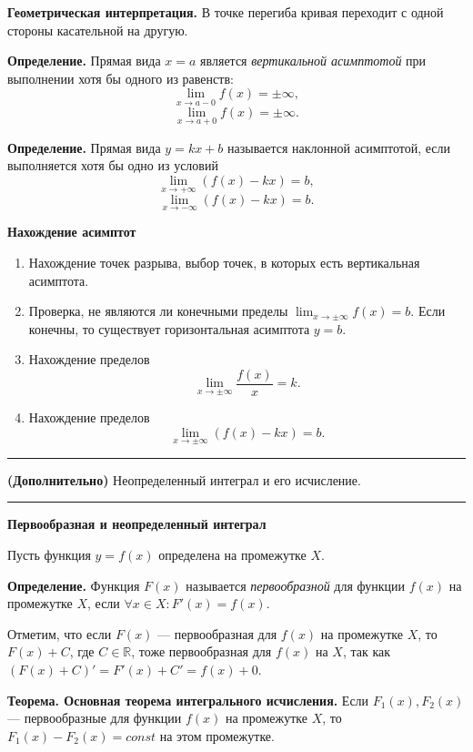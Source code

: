 \documentclass[12pt]{article}
\begin{document}
\textbf{Геометрическая интерпретация.} В точке перегиба кривая переходит с одной стороны касательной на другую.


\textbf{Определение.} Прямая вида $x = a$ является \textit{вертикальной асимптотой} при выполнении хотя бы одного из равенств:
$$
\lim_{x \rightarrow a-0}f(x) = \pm \infty,
$$
$$
\lim_{x \rightarrow a+0}f(x) = \pm \infty.
$$

\textbf{Определение.} Прямая вида $y = kx + b$ называется наклонной асимптотой, если выполняется хотя бы одно из условий
$$
	\lim_{x \rightarrow +\infty} (f(x)-kx) = b,
$$
$$
	\lim_{x \rightarrow -\infty} (f(x)-kx) = b.
$$

\textbf{Нахождение асимптот}

\begin{enumerate}
\item Нахождение точек разрыва, выбор точек, в которых есть вертикальная асимптота.

\item Проверка, не являются ли конечными пределы $\lim_{x \rightarrow \pm\infty}f(x) = b$. Если конечны, то существует горизонтальная асимптота $y = b$.

\item Нахождение пределов 
$$
	\lim_{x \rightarrow \pm \infty} \frac{f(x)}{x} = k.
$$
\item Нахождение пределов 
$$
	\lim_{x \rightarrow \pm \infty} (f(x)-kx) = b.
$$
\end{enumerate}


\noindent\rule{\textwidth}{1pt}
\textbf{(Дополнительно)} Неопределенный интеграл и его исчисление.
	
\noindent\rule{\textwidth}{1pt}

\textbf{Первообразная и неопределенный интеграл}

Пусть функция $y = f(x)$ определена на промежутке $X$.


\textbf{Определение.} Функция $F(x)$ называется \textit{первообразной} для функции $f(x)$ на промежутке $X$, если $\forall x \in X: F'(x) = f(x)$.

Отметим, что если $F(x)$ --- первообразная для $f(x)$ на промежутке $X$, то $F(x) + C$, где $C \in \mathbb{R}$, тоже первообразная для $f(x)$ на $X$, так как $(F(x) + C)' = F'(x) + C' = f(x) + 0$.

\textbf{Теорема. Основная теорема интегрального исчисления.} Если $F_1(x), F_2(x)$ --- первообразные для функции $f(x)$ на промежутке $X$, то $F_1(x) - F_2(x) = const$ на этом промежутке.
\end{document}
